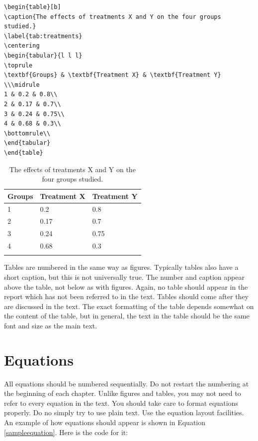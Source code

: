 {\footnotesize
\begin{verbatim}
\begin{table}[b]
\caption{The effects of treatments X and Y on the four groups studied.}
\label{tab:treatments}
\centering
\begin{tabular}{l l l}
\toprule
\textbf{Groups} & \textbf{Treatment X} & \textbf{Treatment Y} \\\midrule
1 & 0.2 & 0.8\\
2 & 0.17 & 0.7\\
3 & 0.24 & 0.75\\
4 & 0.68 & 0.3\\
\bottomrule\\
\end{tabular}
\end{table}
\end{verbatim}
}

\begin{table}[b]
\caption{The effects of treatments X and Y on the four groups studied.}
\label{tab:treatments}
\centering
\begin{tabular}{l l l}
\toprule
\textbf{Groups} & \textbf{Treatment X} & \textbf{Treatment Y} \\
\midrule
1 & 0.2 & 0.8\\
2 & 0.17 & 0.7\\
3 & 0.24 & 0.75\\
4 & 0.68 & 0.3\\
\bottomrule\\
\end{tabular}
\end{table}

Tables are numbered in the same way as figures. Typically tables also have a short caption, but this is not universally true. The number and caption appear above the table, not below as with figures. Again, no table should appear in the report which has not been referred to in the text. Tables should come after they are discussed in the text. The exact formatting of the table depends somewhat on the content of the table, but in general, the text in the table should be the same font and size as the main text. 

\section{Equations}
All equations should be numbered sequentially. Do not restart the numbering at the beginning of each chapter. Unlike figures and tables, you may not need to refer to every equation in the text. You should take care to format equations properly. Do no simply try to use plain text. Use the equation layout facilities. An example of how equations should appear is shown in Equation \ref{sampleequation}. Here is the code for it:

